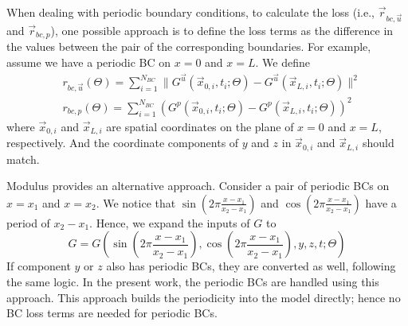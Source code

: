 
When dealing with periodic boundary conditions, to calculate the loss (i.e., $\vec{r}_{bc,\vec{u}}$ and $\vec{r}_{bc, p}$), one possible approach is to define the loss terms as the difference in the values between the pair of the corresponding boundaries.
For example, assume we have a periodic BC on $x=0$ and $x=L$.
We define
\begin{equation}\label{eq:naive-periodic-bc}
    \begin{aligned}
    &r_{bc,\vec{u}}(\Theta) = \sum\limits_{i=1}^{N_{BC}} \lVert G^{\vec{u}}(\vec{x}_{0,i}, t_i; \Theta) - G^{\vec{u}}(\vec{x}_{L,i}, t_i; \Theta) \rVert^2\\
    &r_{bc,p}(\Theta) = \sum\limits_{i=1}^{N_{BC}} ( G^{p}(\vec{x}_{0,i}, t_i; \Theta) - G^{p}(\vec{x}_{L,i}, t_i; \Theta) )^2
    \end{aligned}
\end{equation}
where $\vec{x}_{0,i}$ and $\vec{x}_{L,i}$ are spatial coordinates on the plane of $x=0$ and $x=L$, respectively.
And the coordinate components of $y$ and $z$ in $\vec{x}_{0,i}$ and $\vec{x}_{L,i}$ should match.

Modulus provides an alternative approach.
Consider a pair of periodic BCs on $x=x_1$ and $x=x_2$.
We notice that $\sin(2\pi\frac{x-x_1}{x_2-x_1})$ and  $\cos(2\pi\frac{x-x_1}{x_2-x_1})$ have a period of $x_2-x_1$.
Hence, we expand the inputs of $G$ to
\begin{equation}\label{eq:periodic-G}
    G = G(\sin(2\pi\frac{x-x_1}{x_2-x_1}), \cos(2\pi\frac{x-x_1}{x_2-x_1}), y, z, t; \Theta)
\end{equation}
If component $y$ or $z$ also has periodic BCs, they are converted as well, following the same logic.
In the present work, the periodic BCs are handled using this approach.
This approach builds the periodicity into the model directly; hence no BC loss terms are needed for periodic BCs.
